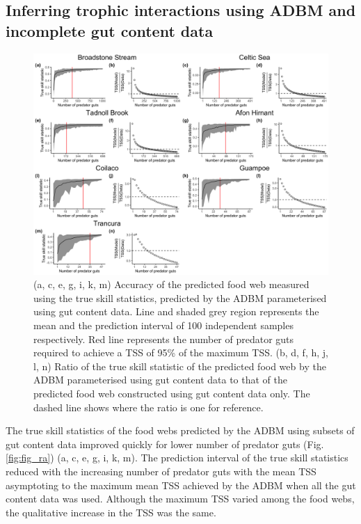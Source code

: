 \documentclass{article}
\begin{document}
\hypertarget{inferring-trophic-interactions-using-adbm-and-incomplete-gut-content-data}{%
\subsection{Inferring trophic interactions using ADBM and incomplete gut
content
data}\label{inferring-trophic-interactions-using-adbm-and-incomplete-gut-content-data}}

\begin{figure}

{\centering \includegraphics[width=500px]{../../results/misc/plot_TSS_ratio} 

}

\caption{\label{fig:fig_ra} (a, c, e, g, i, k, m) Accuracy of the predicted food web measured using the true skill statistics, predicted by the ADBM parameterised using gut content data. Line and shaded grey region represents the mean and the prediction interval of 100 independent samples respectively. Red line represents the number of predator guts required to achieve a TSS of 95\% of the maximum TSS. (b, d, f, h, j, l, n) Ratio of the true skill statistic of the predicted food web by the ADBM parameterised using gut content data to that of the predicted food web constructed using gut content data only. The dashed line shows where the ratio is one for reference.}\label{fig:unnamed-chunk-2}
\end{figure}

The true skill statistics of the food webs predicted by the ADBM using
subsets of gut content data improved quickly for lower number of
predator guts (Fig. \ref{fig:fig_ra}) (a, c, e, g, i, k, m). The
prediction interval of the true skill statistics reduced with the
increasing number of predator guts with the mean TSS asymptoting to the
maximum mean TSS achieved by the ADBM when all the gut content data was
used. Although the maximum TSS varied among the food webs, the
qualitative increase in the TSS was the same.
\end{document}
